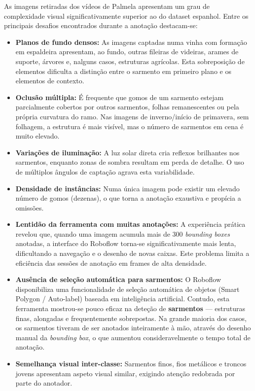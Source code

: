 As imagens retiradas dos vídeos de Palmela apresentam um grau de complexidade
visual significativamente superior ao do dataset espanhol. Entre os principais
desafios encontrados durante a anotação destacam-se:

\begin{itemize}
  \item \textbf{Planos de fundo densos:} As imagens captadas numa vinha com
    formação em espaldeira apresentam, ao fundo, outras fileiras de videiras,
    arames de suporte, árvores e, nalguns casos, estruturas agrícolas. Esta
    sobreposição de elementos dificulta a distinção entre o sarmento em
    primeiro plano e os elementos de contexto.

  \item \textbf{Oclusão múltipla:} É frequente que gomos de um sarmento
    estejam parcialmente cobertos por outros sarmentos, folhas remanescentes
    ou pela própria curvatura do ramo. Nas imagens de inverno/início de
    primavera, sem folhagem, a estrutura é mais visível, mas o número de
    sarmentos em cena é muito elevado.

  \item \textbf{Variações de iluminação:} A luz solar direta cria reflexos
    brilhantes nos sarmentos, enquanto zonas de sombra resultam em perda de
    detalhe. O uso de múltiplos ângulos de captação agrava esta variabilidade.

  \item \textbf{Densidade de instâncias:} Numa única imagem pode existir um
    elevado número de gomos (dezenas), o que torna a anotação exaustiva e
    propícia a omissões.

  \item \textbf{Lentidão da ferramenta com muitas anotações:} A experiência
    prática revelou que, quando uma imagem acumula mais de 300
    \textit{bounding boxes} anotadas, a interface do Roboflow torna-se
    significativamente mais lenta, dificultando a navegação e o desenho de
    novas caixas. Este problema limita a eficiência das sessões de anotação
    em frames de alta densidade.

  \item \textbf{Ausência de seleção automática para sarmentos:} O Roboflow
    disponibiliza uma funcionalidade de seleção automática de objetos (Smart
    Polygon / Auto-label) baseada em inteligência artificial. Contudo, esta
    ferramenta mostrou-se pouco eficaz na deteção de \textbf{sarmentos} —
    estruturas finas, alongadas e frequentemente sobrepostas. Na grande
    maioria dos casos, os sarmentos tiveram de ser anotados inteiramente à
    mão, através do desenho manual da \textit{bounding box}, o que aumentou
    consideravelmente o tempo total de anotação.

  \item \textbf{Semelhança visual inter-classe:} Sarmentos finos, fios
    metálicos e troncos jovens apresentam aspeto visual similar, exigindo
    atenção redobrada por parte do anotador.
\end{itemize}

